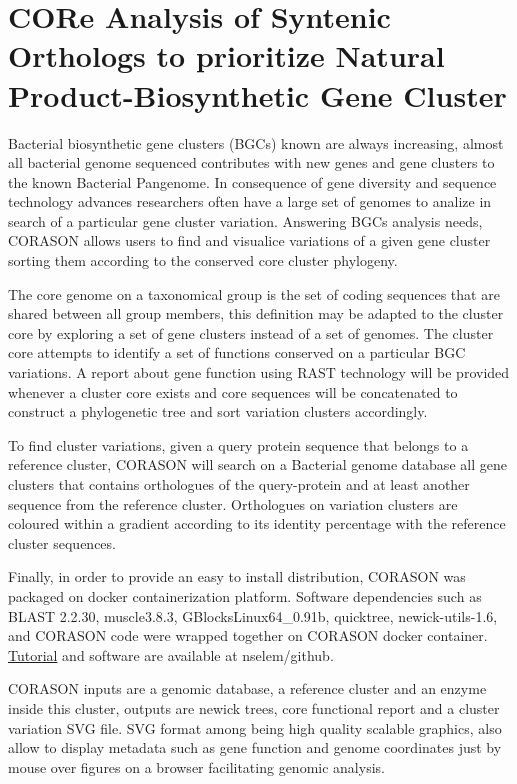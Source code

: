 \documentclass[12pt,twoside]{reedthesis}
\begin{document}
  \section{CORe Analysis of Syntenic Orthologs to prioritize Natural
  Product-Biosynthetic Gene
  Cluster}\label{core-analysis-of-syntenic-orthologs-to-prioritize-natural-product-biosynthetic-gene-cluster}
  
  Bacterial biosynthetic gene clusters (BGCs) known are always increasing,
  almost all bacterial genome sequenced contributes with new genes and
  gene clusters to the known Bacterial Pangenome. In consequence of gene
  diversity and sequence technology advances researchers often have a
  large set of genomes to analize in search of a particular gene cluster
  variation. Answering BGCs analysis needs, CORASON allows users to find
  and visualice variations of a given gene cluster sorting them according
  to the conserved core cluster phylogeny.
  
  The core genome on a taxonomical group is the set of coding sequences
  that are shared between all group members, this definition may be
  adapted to the cluster core by exploring a set of gene clusters instead
  of a set of genomes. The cluster core attempts to identify a set of
  functions conserved on a particular BGC variations. A report about gene
  function using RAST technology will be provided whenever a cluster core
  exists and core sequences will be concatenated to construct a
  phylogenetic tree and sort variation clusters accordingly.
  
  To find cluster variations, given a query protein sequence that belongs
  to a reference cluster, CORASON will search on a Bacterial genome
  database all gene clusters that contains orthologues of the
  query-protein and at least another sequence from the reference cluster.
  Orthologues on variation clusters are coloured within a gradient
  according to its identity percentage with the reference cluster
  sequences.
  
  Finally, in order to provide an easy to install distribution, CORASON
  was packaged on docker containerization platform. Software dependencies
  such as BLAST 2.2.30, muscle3.8.3, GBlocksLinux64\_0.91b, quicktree,
  newick-utils-1.6, and CORASON code were wrapped together on CORASON
  docker container.
  \href{https://github.com/nselem/EvoDivMet/wiki}{Tutorial} and software
  are available at nselem/github.
  
  CORASON inputs are a genomic database, a reference cluster and an enzyme
  inside this cluster, outputs are newick trees, core functional report
  and a cluster variation SVG file. SVG format among being high quality
  scalable graphics, also allow to display metadata such as gene function
  and genome coordinates just by mouse over figures on a browser
  facilitating genomic analysis.
  
\end{document}
